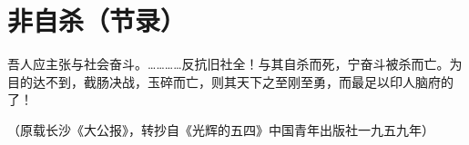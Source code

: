 \section{非自杀（节录）}



吾人应主张与社会奋斗。…………反抗旧社全！与其自杀而死，宁奋斗被杀而亡。为目的达不到，截肠决战，玉碎而亡，则其天下之至刚至勇，而最足以印人脑府的了！

\begin{flushright}（原载长沙《大公报》，转抄自《光辉的五四》中国青年出版社一九五九年）\end{flushright}


